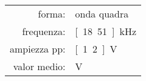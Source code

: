 \begin{table}[h]
    \centering
    \begin{tabular}{rl}
        forma: & onda quadra\\
        frequenza: & \unit[18.51]{kHz}\\
        ampiezza pp: & \unit[1.2]{V}\\
        valor medio: & \unit[0]{V}
    \end{tabular}
\end{table}
